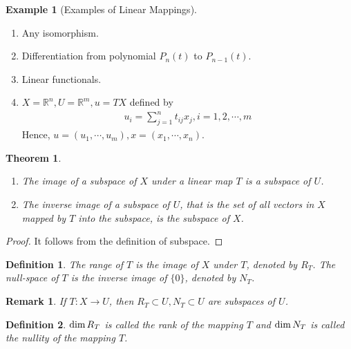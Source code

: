 \documentclass[11pt]{book}
\newtheorem{definition}{Definition}[section]
\newtheorem{theorem}{Theorem}[section]
\newtheorem{remark}{Remark}[section]
\theoremstyle{definition}
\newtheorem{example}{Example}[section]
\numberwithin{equation}{chapter}
\begin{document}
\medskip

\begin{example}[Examples of Linear Mappings]
~\begin{enumerate}[label=(\arabic*)]
    \item Any isomorphism.
    \item Differentiation from polynomial $P_n(t)$ to $P_{n-1}(t)$.
    \item Linear functionals.
    \item $X=\mathbb{R}^n, U=\mathbb{R}^m, u = TX$ defined by
    \begin{align*}
        u_i = \sum^n_{j=1}t_{ij}x_j, i = 1,2,\cdots,m
    \end{align*}
    Hence, $u = (u_1,\cdots,u_m), x = (x_1,\cdots,x_n)$.
\end{enumerate}
\end{example}

\medskip

\begin{theorem}
~\begin{enumerate}[label=(\alph*)]
    \item The image of a subspace of $X$ under a linear map $T$ is a subspace of $U$.
    \item The inverse image of a subspace of $U$, that is the set of all vectors in $X$ mapped by $T$ into the subspace, is the subspace of $X$.
\end{enumerate}
\end{theorem}
\begin{proof}
It follows from the definition of subspace.
\end{proof}

\medskip

\begin{definition}
The range of $T$ is the image of $X$ under $T$, denoted by $R_T$. The null-space of $T$ is the inverse image of $\{0\}$, denoted by $N_T$.
\end{definition}
\begin{remark}
If $T:X\to U$, then $R_T\subset U, N_T\subset U$ are subspaces of $U$.
\end{remark}

\medskip

\begin{definition}
${\rm dim}\,R_T$ is called the rank of the mapping $T$ and ${\rm dim}\,N_T$ is called the nullity of the mapping $T$.
\end{definition}

\medskip
\end{document}
